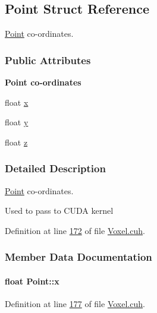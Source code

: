 \hypertarget{structPoint}{}\subsection{Point Struct Reference}
\label{structPoint}


\hyperlink{structPoint}{Point} co-\/ordinates.  


\subsubsection*{Public Attributes}
\begin{Indent}{\bf Point co-\/ordinates}\par
\begin{DoxyCompactItemize}
\item 
float \hyperlink{structPoint_a05dfe2dfbde813ad234b514f30e662f1}{x}
\item 
float \hyperlink{structPoint_a6101960c8d2d4e8ea1d32c9234bbeb8d}{y}
\item 
float \hyperlink{structPoint_a9a666531e0e99adff132be93d2407d0c}{z}
\end{DoxyCompactItemize}
\end{Indent}


\subsubsection{Detailed Description}
\hyperlink{structPoint}{Point} co-\/ordinates. 

Used to pass to C\+U\+DA kernel 

Definition at line \hyperlink{Voxel_8cuh_source_l00172}{172} of file \hyperlink{Voxel_8cuh_source}{Voxel.\+cuh}.



\subsubsection{Member Data Documentation}
\paragraph[{\texorpdfstring{x}{x}}]{\setlength{\rightskip}{0pt plus 5cm}float Point\+::x}\hypertarget{structPoint_a05dfe2dfbde813ad234b514f30e662f1}{}\label{structPoint_a05dfe2dfbde813ad234b514f30e662f1}


Definition at line \hyperlink{Voxel_8cuh_source_l00177}{177} of file \hyperlink{Voxel_8cuh_source}{Voxel.\+cuh}.

